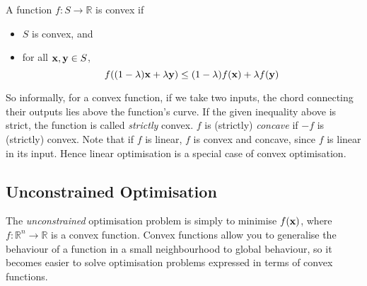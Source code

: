\begin{definition}
    A function \(f \colon S \to \mathbb R\) is convex if
    \begin{itemize}
        \item \(S\) is convex, and
        \item for all \(\vb x, \vb y \in S\),
        \[ f\qty((1-\lambda)\vb x + \lambda \vb y) \leq (1-\lambda)f(\vb x) + \lambda f(\vb y) \]
    \end{itemize}
\end{definition}
\noindent So informally, for a convex function, if we take two inputs, the chord connecting their outputs lies above the function's curve.
If the given inequality above is strict, the function is called \textit{strictly} convex.
\(f\) is (strictly) \textit{concave} if \(-f\) is (strictly) convex.
Note that if \(f\) is linear, \(f\) is convex and concave, since \(f\) is linear in its input.
Hence linear optimisation is a special case of convex optimisation.

\subsection{Unconstrained Optimisation}
The \textit{unconstrained} optimisation problem is simply to minimise \(f(\vb x)\), where \(f \colon \mathbb R^n \to \mathbb R\) is a convex function.
Convex functions allow you to generalise the behaviour of a function in a small neighbourhood to global behaviour, so it becomes easier to solve optimisation problems expressed in terms of convex functions.

